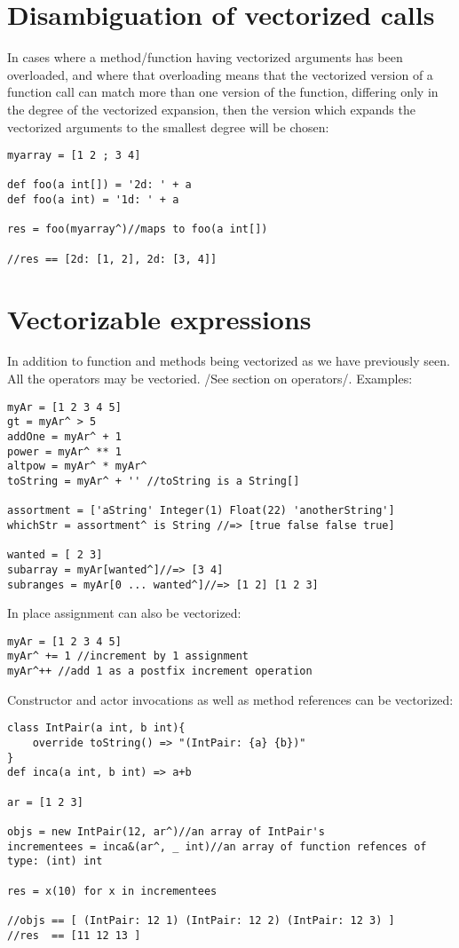 \documentclass[conc-doc]{subfiles}
\begin{document}
\section{Disambiguation of vectorized calls}
In cases where a method/function having vectorized arguments has been overloaded, and where that overloading means that the vectorized version of a function call can match more than one version of the function, differing only in the degree of the vectorized expansion, then the version which expands the vectorized arguments to the smallest degree will be chosen:
\begin{lstlisting}
myarray = [1 2 ; 3 4]

def foo(a int[]) = '2d: ' + a
def foo(a int) = '1d: ' + a

res = foo(myarray^)//maps to foo(a int[])

//res == [2d: [1, 2], 2d: [3, 4]]
\end{lstlisting}

\section{Vectorizable expressions}
In addition to function and methods being vectorized as we have previously seen. All the operators may be vectoried. /See section on operators/. Examples:
\begin{lstlisting}
myAr = [1 2 3 4 5]
gt = myAr^ > 5
addOne = myAr^ + 1
power = myAr^ ** 1
altpow = myAr^ * myAr^
toString = myAr^ + '' //toString is a String[]

assortment = ['aString' Integer(1) Float(22) 'anotherString']
whichStr = assortment^ is String //=> [true false false true]

wanted = [ 2 3]
subarray = myAr[wanted^]//=> [3 4]
subranges = myAr[0 ... wanted^]//=> [1 2] [1 2 3]
\end{lstlisting}

In place assignment can also be vectorized:
\begin{lstlisting}
myAr = [1 2 3 4 5]
myAr^ += 1 //increment by 1 assignment
myAr^++ //add 1 as a postfix increment operation
\end{lstlisting}

Constructor and actor invocations as well as method references can be vectorized:
\begin{lstlisting}
class IntPair(a int, b int){
	override toString() => "(IntPair: {a} {b})"
}
def inca(a int, b int) => a+b

ar = [1 2 3]

objs = new IntPair(12, ar^)//an array of IntPair's
incrementees = inca&(ar^, _ int)//an array of function refences of type: (int) int

res = x(10) for x in incrementees

//objs == [ (IntPair: 12 1) (IntPair: 12 2) (IntPair: 12 3) ]
//res  == [11 12 13 ]
\end{lstlisting}
\end{document}
